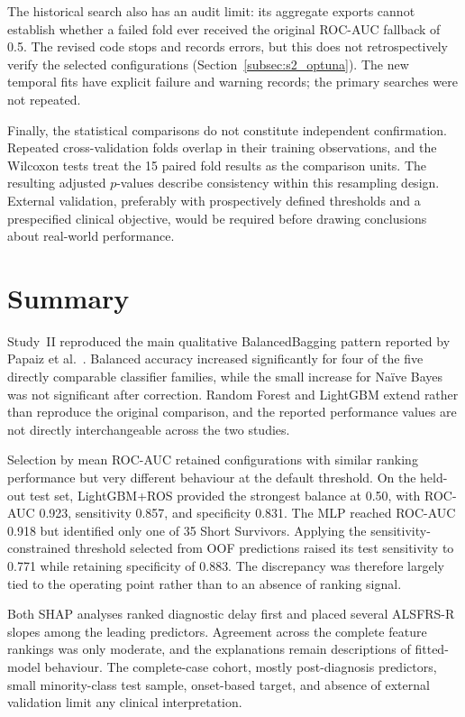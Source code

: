 The historical search also has an audit limit: its aggregate exports cannot establish whether a failed fold ever received the original ROC-AUC fallback of 0.5. The revised code stops and records errors, but this does not retrospectively verify the selected configurations (Section~\ref{subsec:s2_optuna}). The new temporal fits have explicit failure and warning records; the primary searches were not repeated.

Finally, the statistical comparisons do not constitute independent confirmation. Repeated cross-validation folds overlap in their training observations, and the Wilcoxon tests treat the 15 paired fold results as the comparison units. The resulting adjusted $p$-values describe consistency within this resampling design. External validation, preferably with prospectively defined thresholds and a prespecified clinical objective, would be required before drawing conclusions about real-world performance.

\section{Summary}
\label{sec:s2r_summary}

Study~II reproduced the main qualitative BalancedBagging pattern reported by Papaiz et al.~\cite{Papaiz2024}. Balanced accuracy increased significantly for four of the five directly comparable classifier families, while the small increase for Naïve Bayes was not significant after correction. Random Forest and LightGBM extend rather than reproduce the original comparison, and the reported performance values are not directly interchangeable across the two studies.

Selection by mean ROC-AUC retained configurations with similar ranking performance but very different behaviour at the default threshold. On the held-out test set, LightGBM+ROS provided the strongest balance at 0.50, with ROC-AUC 0.923, sensitivity 0.857, and specificity 0.831. The MLP reached ROC-AUC 0.918 but identified only one of 35 Short Survivors. Applying the sensitivity-constrained threshold selected from OOF predictions raised its test sensitivity to 0.771 while retaining specificity of 0.883. The discrepancy was therefore largely tied to the operating point rather than to an absence of ranking signal.

Both SHAP analyses ranked diagnostic delay first and placed several ALSFRS-R slopes among the leading predictors. Agreement across the complete feature rankings was only moderate, and the explanations remain descriptions of fitted-model behaviour. The complete-case cohort, mostly post-diagnosis predictors, small minority-class test sample, onset-based target, and absence of external validation limit any clinical interpretation.


